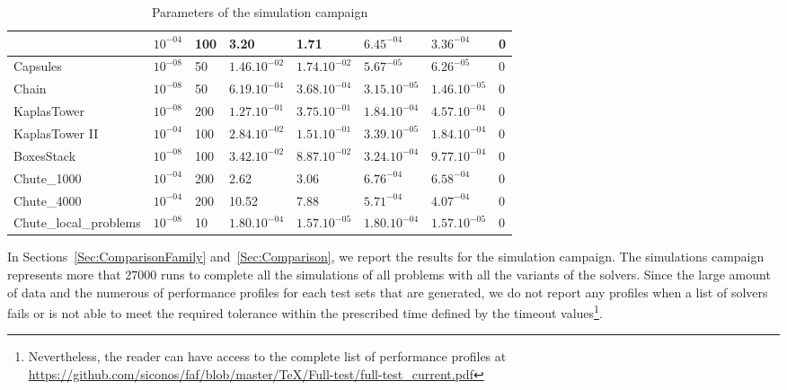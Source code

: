 \begin{table}
\begin{tabular}{|l|l|l|l|l|l|l|l|}
  & $10^{-04}$
  & 100
  & 3.20
  & 1.71
  & $6.45^{-04}$
  & $3.36^{-04}$
  & 0
  \\
  \hline
  Capsules
  & $10^{-08}$
  & 50
  & $1.46.10^{-02}$
  & $1.74.10^{-02}$
  & $5.67^{-05}$
  & $6.26^{-05}$
  & 0
  \\
  \hline
  Chain
  & $10^{-08}$
  & 50
  & $6.19.10^{-04}$
  & $3.68.10^{-04}$
  & $3.15.10^{-05}$
  & $1.46.10^{-05}$
  & 0
  \\
  \hline
  KaplasTower
  & $10^{-08}$
  & 200
  & $1.27.10^{-01}$
  & $3.75.10^{-01}$
  & $1.84.10^{-04}$
  & $4.57.10^{-04}$
  & 0
  \\
  \hline
  KaplasTower II
  & $10^{-04}$
  & 100
  & $2.84.10^{-02}$
  & $1.51.10^{-01}$
  & $3.39.10^{-05}$
  & $1.84.10^{-04}$
  & 0
  \\
  \hline
  BoxesStack
  & $10^{-08}$
  & 100
  & $3.42.10^{-02}$
  & $8.87.10^{-02}$
  & $3.24.10^{-04}$
  & $9.77.10^{-04}$
  & 0
  \\
  \hline
  Chute\_1000
  & $10^{-04}$
  & 200
  & 2.62
  & 3.06
  & $6.76^{-04}$
  & $6.58^{-04}$
  & 0
  \\
  \hline
  Chute\_4000
  & $10^{-04}$
  & 200
  & 10.52
  & 7.88
  & $5.71^{-04}$
  & $4.07^{-04}$
  & 0
  \\
  \hline
  Chute\_local\_problems
  & $10^{-08}$
  & 10
  & $1.80.10^{-04}$
  & $1.57.10^{-05}$
  & $1.80.10^{-04}$
  & $1.57.10^{-05}$
  &  0 \\
  \hline
\end{tabular}
\caption{Parameters of the simulation campaign}
\label{Tab:fclib-simulation}
\end{table}

In Sections~\ref{Sec:ComparisonFamily} and~\ref{Sec:Comparison}, we report the results for the simulation campaign. The simulations campaign represents more that $27000$ runs to complete all the simulations of all problems with all the variants of the solvers.  Since the large amount of data and the numerous of performance profiles for each test sets that are generated, we do not report any profiles  when a list of solvers fails or is not able to meet the required tolerance within the prescribed time defined by the timeout values\footnote{Nevertheless, the reader can have access to the complete list of performance profiles at \href{https://github.com/siconos/faf/blob/master/TeX/Full-test/full-test_current.pdf}{https://github.com/siconos/faf/blob/master/TeX/Full-test/full-test\_current.pdf}}.


